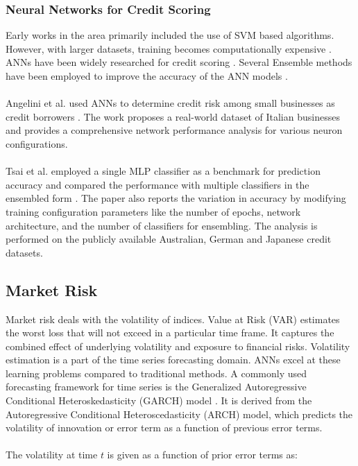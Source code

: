 \documentclass[a4paper, 12pt]{article}
\begin{document}
\vskip 0.2in
\subsubsection{Neural Networks for Credit Scoring}
\noindent Early works in the area primarily included the use of SVM based algorithms. However, with larger datasets, training becomes computationally expensive \cite{harris2015credit}. ANNs have been widely researched for credit scoring \cite{li2002neural, hu2006ann}. Several Ensemble methods have been employed to improve the accuracy of the ANN models \cite{tsai2008using}.
\\
\\
Angelini et al. used ANNs to determine credit risk among small businesses as credit borrowers \cite{angelini2008neural}. The work proposes a real-world dataset of Italian businesses and provides a comprehensive network performance analysis for various neuron configurations.
\\
\\
Tsai et al. employed a single MLP classifier as a benchmark for prediction accuracy and compared the performance with multiple classifiers in the ensembled form \cite{tsai2008using}. The paper also reports the variation in accuracy by modifying training configuration parameters like the number of epochs, network architecture, and the number of classifiers for ensembling. The analysis is performed on the publicly available Australian, German and Japanese credit datasets.


\vskip 0.2in
\subsection{Market Risk}
\noindent Market risk deals with the volatility of indices. Value at Risk (VAR) estimates the worst loss that will not exceed in a particular time frame. It captures the combined effect of underlying volatility and exposure to financial risks. Volatility estimation is a part of the time series forecasting domain. ANNs excel at these learning problems compared to traditional methods. A commonly used forecasting framework for time series is the Generalized Autoregressive Conditional Heteroskedasticity (GARCH) model \cite{bollerslev1986generalized}. It is derived from the Autoregressive Conditional Heteroscedasticity (ARCH) model, which predicts the volatility of innovation or error term as a function of previous error terms.
\\
\\
The volatility at time \(t\) is given as a function of prior error terms as:
\end{document}

